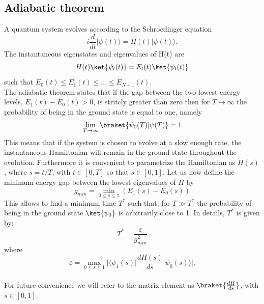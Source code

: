     \subsection{Adiabatic theorem}\label{subsec:adiabatic theorem}
    A quantum system evolves according to the Schroedinger equation
    \begin{equation}
        i\frac{d}{dt}|\psi(t)\rangle = H(t)|\psi(t)\rangle.
    \end{equation}
    The instantaneous eigenstates and eigenvalues of H(t) are
    \begin{equation}
        H(t)\ket{\psi_l(t)} = E_l(t)\ket{\psi_l(t)}
    \end{equation}
    such that $E_0(t) \leq E_1(t) \leq ... \leq E_{N-1}(t)$. \\
    The adiabatic theorem states that if the gap between the two lowest energy levels, $E_{1}(t) - E_{0}(t) > 0$, is stritcly greater than zero then for $T\rightarrow \infty$ the probability of being in the ground state is equal to one, namely
    \begin{equation}
        \lim_{T \to \infty} \braket{\psi_0(T)|\psi(T)}= 1
    \end{equation}
    This means that if the system is chosen to evolve at a slow enough rate, the instantaneous Hamiltonian will remain in the ground state throughout the evolution. Furthermore it is convenient to parametrize the Hamiltonian as $H(s)$, where $s=t/T$, with $t \in [0,T]$ so that $s \in [0,1]$.
    Let us now define the minimum energy gap between the lowest eigenvalues of $H$ by
    \begin{equation}
        g_{min} = \min_{0 \leq s \leq 1} (E_1(s)-E_0(s))
    \end{equation}
    This allows to find a minimum time $T^*$ such that, for $T\gg T^*$ the probability of being in the ground state $\ket{\psi_0}$ is arbitrarily close to 1. In details, $T^*$ is given by:
    \begin{equation}
        T^* = \frac{\varepsilon}{g^{2}_{min}}
        \label{eq:adiabatic_time}
    \end{equation}
    where
    \begin{equation}
        \varepsilon = \max_{0 \leq s \leq 1} \Big| \Big\langle \psi_1(s)\Big| \frac{dH(s)}{ds} \Big| \psi_0(s)\Big\rangle\Big|.
    \end{equation}\\
For future convenience we will refer to the matrix element as $\braket{\frac{dH}{ds}}$, with $s\in[0,1]$. \\ \\
